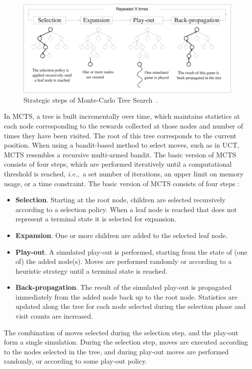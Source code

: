 \documentclass{kecsmstr}
\newcommand{\ie}{{\it i.e.,}~}
\begin{document}
\begin{figure}[ht]
	\centering
	\includegraphics[width=.9\textwidth]{img/figure1.eps}
	\caption[Strategic steps of Monte-Carlo Tree Search.]{Strategic steps of Monte-Carlo Tree Search~\protect{}.}
	\label{fig:mcts-algorithm}
\end{figure}
\noindent In MCTS, a tree is built incrementally over time, which maintains statistics at each node corresponding to the rewards collected at those nodes and number of times  they have been visited. The root of this tree corresponds to the current position. When using a bandit-based method to select moves, such as in UCT, MCTS resembles a recursive multi-armed bandit. The basic version of MCTS consists of four steps, which are performed iteratively until a computational threshold is reached, \ie a set number of iterations, an upper limit on memory usage, or a time constraint. The basic version of MCTS consists of four steps :
\begin{itemize}
\item {\bf Selection}. Starting at the root node, children are selected recursively according to a selection policy. When a leaf node is reached that does not represent a terminal state it is selected for expansion.
\item {\bf Expansion}. One or more children are added to the selected leaf node.
\item {\bf Play-out}. A simulated play-out is performed, starting from the state of (one of) the added node(s). Moves are performed randomly or according to a heuristic strategy until a terminal state is reached.
\item {\bf Back-propagation}. The result of the simulated play-out is propagated immediately from the added node back up to the root node. Statistics are updated along the tree for each node selected during the selection phase and visit counts are increased.
\end{itemize}
The combination of moves selected during the selection step, and the play-out form a single simulation. During the selection step, moves are executed according to the nodes selected in the tree, and during play-out moves are performed randomly, or according to some play-out policy.
\end{document}
